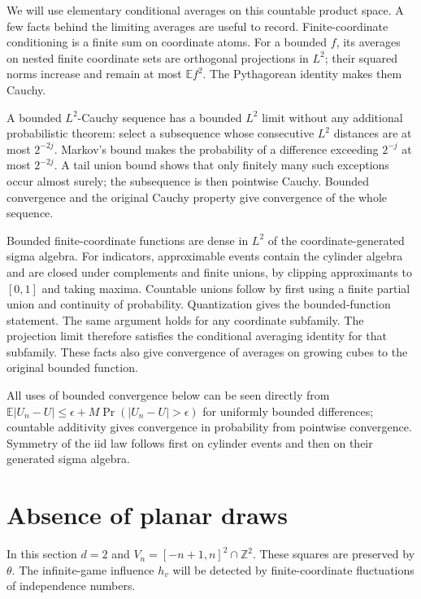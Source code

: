 \documentclass[11pt,a4paper]{article}
\newcommand{\Z}{\mathbb Z}
\newcommand{\E}{\mathbb E}
\numberwithin{equation}{section}
\begin{document}
We will use elementary conditional averages on this countable product
space. A few facts behind the limiting averages are useful to record.
Finite-coordinate conditioning is a finite sum on coordinate atoms.
For a bounded $f$, its averages on nested finite coordinate sets are
orthogonal projections in $L^2$; their squared norms increase and remain
at most $\E f^2$. The Pythagorean identity makes them Cauchy.

A bounded $L^2$-Cauchy sequence has a bounded $L^2$ limit without any
additional probabilistic theorem: select a subsequence whose consecutive
$L^2$ distances are at most $2^{-2j}$. Markov's bound makes the probability
of a difference exceeding $2^{-j}$ at most $2^{-2j}$. A tail union bound
shows that only finitely many such exceptions occur almost surely; the
subsequence is then pointwise Cauchy. Bounded convergence and the original
Cauchy property give convergence of the whole sequence.

Bounded finite-coordinate functions are dense in $L^2$ of the
coordinate-generated sigma algebra. For indicators, approximable events
contain the cylinder algebra and are closed under complements and finite
unions, by clipping approximants to $[0,1]$ and taking maxima. Countable
unions follow by first using a finite partial union and continuity of
probability. Quantization gives the bounded-function statement. The same
argument holds for any coordinate subfamily. The projection limit
therefore satisfies the conditional averaging identity for that subfamily.
These facts also give convergence of averages on growing cubes to the
original bounded function.

All uses of bounded convergence below can be seen directly from
$\E|U_n-U|\le\epsilon+M\Pr(|U_n-U|>\epsilon)$ for uniformly bounded
differences; countable additivity gives convergence in probability from
pointwise convergence. Symmetry of the iid law follows first on cylinder
events and then on their generated sigma algebra.


\section{Absence of planar draws}\label{sec:planar}
In this section $d=2$ and
$V_n=[-n+1,n]^2\cap\Z^2$. These squares are preserved by $\theta$.
The infinite-game influence $h_v$ will be detected by finite-coordinate
fluctuations of independence numbers.
\end{document}
